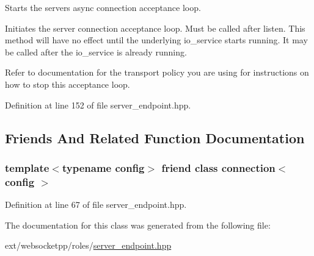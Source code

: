 Starts the server\textquotesingle{}s async connection acceptance loop. 

Initiates the server connection acceptance loop. Must be called after listen. This method will have no effect until the underlying io\+\_\+service starts running. It may be called after the io\+\_\+service is already running.

Refer to documentation for the transport policy you are using for instructions on how to stop this acceptance loop. 

Definition at line 152 of file server\+\_\+endpoint.\+hpp.



\subsection{Friends And Related Function Documentation}
\hypertarget{classwebsocketpp_1_1server_a408f6796a357de56c73c3beb2f13c61d}{}
\subsubsection[{connection$<$ config $>$}]{\setlength{\rightskip}{0pt plus 5cm}template$<$typename config$>$ friend class {\bf connection}$<$ config $>$\hspace{0.3cm}{\ttfamily [friend]}}\label{classwebsocketpp_1_1server_a408f6796a357de56c73c3beb2f13c61d}


Definition at line 67 of file server\+\_\+endpoint.\+hpp.



The documentation for this class was generated from the following file\+:\begin{DoxyCompactItemize}
\item 
ext/websocketpp/roles/\hyperlink{server__endpoint_8hpp}{server\+\_\+endpoint.\+hpp}\end{DoxyCompactItemize}
